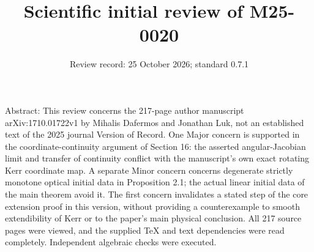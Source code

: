 \documentclass[10pt]{article}
\title{Scientific initial review of M25-0020}
\author{}
\date{Review record: 25 October 2026; standard 0.7.1}
\begin{document}
\maketitle
Abstract: This review concerns the 217-page author manuscript arXiv:1710.01722v1 by Mihalis Dafermos and Jonathan Luk, not an established text of the 2025 journal Version of Record. One Major concern is supported in the coordinate-continuity argument of Section 16: the asserted angular-Jacobian limit and transfer of continuity conflict with the manuscript’s own exact rotating Kerr coordinate map. A separate Minor concern concerns degenerate strictly monotone optical initial data in Proposition 2.1; the actual linear initial data of the main theorem avoid it. The first concern invalidates a stated step of the core extension proof in this version, without providing a counterexample to smooth extendibility of Kerr or to the paper’s main physical conclusion. All 217 source pages were viewed, and the supplied TeX and text dependencies were read completely. Independent algebraic checks were executed.\par
\end{document}
